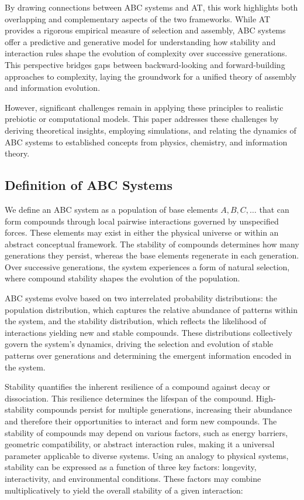 \documentclass[entropy,article,submit,pdftex,oneauthor]{Definitions/mdpi}
\begin{document}
By drawing connections between ABC systems and AT, this work highlights both overlapping and complementary aspects of the two frameworks. While AT provides a rigorous empirical measure of selection and assembly, ABC systems offer a predictive and generative model for understanding how stability and interaction rules shape the evolution of complexity over successive generations. This perspective bridges gaps between backward-looking and forward-building approaches to complexity, laying the groundwork for a unified theory of assembly and information evolution.

However, significant challenges remain in applying these principles to realistic prebiotic or computational models. This paper addresses these challenges by deriving theoretical insights, employing simulations, and relating the dynamics of ABC systems to established concepts from physics, chemistry, and information theory.


\subsection{Definition of ABC Systems}

We define an ABC system as a population of base elements \( A, B, C, \dots \) that can form compounds through local pairwise interactions governed by unspecified forces. These elements may exist in either the physical universe or within an abstract conceptual framework. The stability of compounds determines how many generations they persist, whereas the base elements regenerate in each generation. Over successive generations, the system experiences a form of natural selection, where compound stability shapes the evolution of the population.

ABC systems evolve based on two interrelated probability distributions: the population distribution, which captures the relative abundance of patterns within the system, and the stability distribution, which reflects the likelihood of interactions yielding new and stable compounds. These distributions collectively govern the system's dynamics, driving the selection and evolution of stable patterns over generations and determining the emergent information encoded in the system.

Stability quantifies the inherent resilience of a compound against decay or dissociation. This resilience determines the lifespan of the compound. High-stability compounds persist for multiple generations, increasing their abundance and therefore their opportunities to interact and form new compounds. The stability of compounds may depend on various factors, such as energy barriers, geometric compatibility, or abstract interaction rules, making it a universal parameter applicable to diverse systems. Using an analogy to physical systems, stability can be expressed as a function of three key factors: longevity, interactivity, and environmental conditions. These factors may combine multiplicatively to yield the overall stability of a given interaction:
\end{document}
